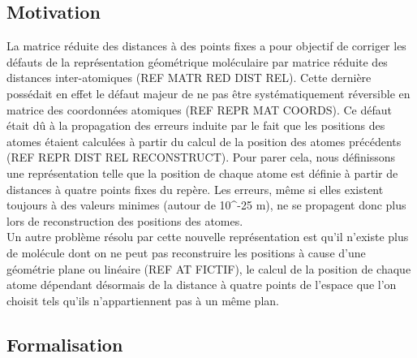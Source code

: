 \subsection{Motivation}
\par La matrice réduite des distances à des points fixes a pour objectif de corriger les défauts de la représentation géométrique moléculaire par matrice réduite des distances inter-atomiques (REF MATR RED DIST REL). Cette dernière possédait en effet le défaut majeur de ne pas être systématiquement réversible en matrice des coordonnées atomiques (REF REPR MAT COORDS). Ce défaut était dû à la propagation des erreurs induite par le fait que les positions des atomes étaient calculées à partir du calcul de la position des atomes précédents (REF REPR DIST REL RECONSTRUCT). Pour parer cela, nous définissons une représentation telle que la position de chaque atome est définie à partir de distances à quatre points fixes du repère. Les erreurs, même si elles existent toujours à des valeurs minimes (autour de 10^{-25} m), ne se propagent donc plus lors de reconstruction des positions des atomes.\\
Un autre problème résolu par cette nouvelle représentation est qu'il n'existe plus de molécule dont on ne peut pas reconstruire les positions à cause d'une géométrie plane ou linéaire (REF AT FICTIF), le calcul de la position de chaque atome dépendant désormais de la distance à quatre points de l'espace que l'on choisit tels qu'ils n'appartiennent pas à un même plan.\\

\subsection{Formalisation}